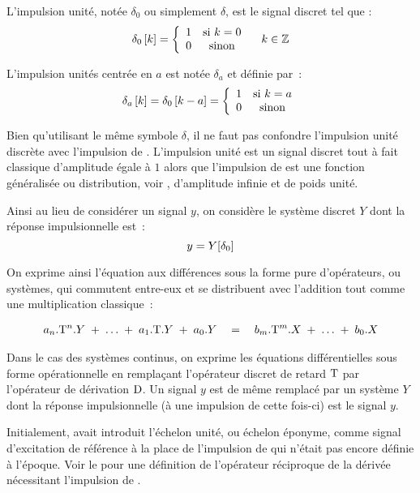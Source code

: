 \begin{definition}
  \label{def:impulsion_unite}
  L'impulsion unité, notée $\delta_0$ ou simplement $\delta$, est le signal discret tel que :
  $$
  \delta_0\left[k\right]=\left\{\begin{array}{cc} {1} & {\text{si } k=0}\\ {0} & {\text{sinon}}\\ \end{array}\right. \quad k\in\mathbb{Z}
  $$

  L'impulsion unités centrée en $a$ est notée $\delta_a$ et définie par~:
  $$
  \delta_a\left[k\right]=\delta_0\left[k-a\right] = \left\{\begin{array}{cc} {1} & {\text{si } k=a}\\ {0} & {\text{sinon}}\\ \end{array}\right.
  $$

  Bien qu'utilisant le même symbole $\delta$, il ne faut pas confondre
  l'impulsion unité discrète avec l'impulsion de \Dirac. L'impulsion
  unité est un signal discret tout à fait classique d'amplitude égale
  à $1$ alors que l'impulsion de \Dirac{} est une fonction généralisée
  ou distribution, voir , d'amplitude infinie et de
  poids unité.
\end{definition}

Ainsi au lieu de considérer un signal $y$, on considère le système discret $Y$ dont la réponse impulsionnelle est~:
\begin{equation}
  y = Y\!\left[\delta_0\right]
\end{equation}



On exprime ainsi l'équation aux différences sous la forme pure
d'opérateurs, ou systèmes, qui commutent entre-eux et se distribuent
avec l'addition tout comme une multiplication classique~:

\begin{eqnarray}
  a_n.\mathrm{T}^n.Y\; +\; \ldots \;+\; a_1.\mathrm{T}.Y \;+\; a_0.Y \quad  = \quad b_m.\mathrm{T}^m.X \;+\; \ldots \;+\; b_0.X
\end{eqnarray}

\begin{remarque}
  Dans le cas des systèmes continus, on exprime les équations
  différentielles sous forme opérationnelle en remplaçant l'opérateur
  discret de retard $\mathrm{T}$ par l'opérateur de dérivation $\mathrm{D}$. Un
  signal $y$ est de même remplacé par un système $Y$ dont la réponse
  impulsionnelle (à une impulsion de \Dirac{} cette fois-ci) est le
  signal $y$.

  Initialement, \Heaviside{} avait introduit l'échelon unité, ou
  échelon éponyme, comme signal d'excitation de référence à la place
  de l'impulsion de \Dirac{} qui n'était pas encore définie à
  l'époque. Voir le  pour une définition de
  l'opérateur réciproque de la dérivée nécessitant l'impulsion de
  \Dirac{}.
\end{remarque}

